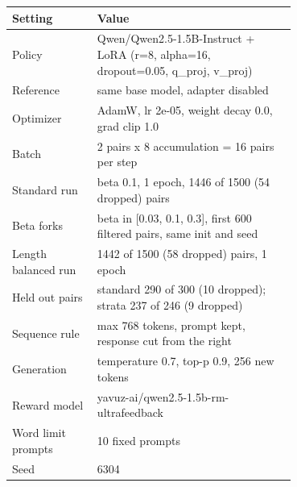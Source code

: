 \begin{tabular}{lp{0.70\linewidth}}
\toprule
Setting & Value \\
\midrule
Policy & Qwen/Qwen2.5-1.5B-Instruct + LoRA (r=8, alpha=16, dropout=0.05, q\_proj, v\_proj) \\
Reference & same base model, adapter disabled \\
Optimizer & AdamW, lr 2e-05, weight decay 0.0, grad clip 1.0 \\
Batch & 2 pairs x 8 accumulation = 16 pairs per step \\
Standard run & beta 0.1, 1 epoch, 1446 of 1500 (54 dropped) pairs \\
Beta forks & beta in [0.03, 0.1, 0.3], first 600 filtered pairs, same init and seed \\
Length balanced run & 1442 of 1500 (58 dropped) pairs, 1 epoch \\
Held out pairs & standard 290 of 300 (10 dropped); strata 237 of 246 (9 dropped) \\
Sequence rule & max 768 tokens, prompt kept, response cut from the right \\
Generation & temperature 0.7, top-p 0.9, 256 new tokens \\
Reward model & yavuz-ai/qwen2.5-1.5b-rm-ultrafeedback \\
Word limit prompts & 10 fixed prompts \\
Seed & 6304 \\
\bottomrule
\end{tabular}
